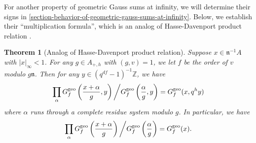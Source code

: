 \documentclass[11pt]{amsart}
\theoremstyle{plain}
\newtheorem{thm}{Theorem}[subsection]
\theoremstyle{definition}
\theoremstyle{remark}
\numberwithin{equation}{section}
\newcommand{\ZZ}{\mathbb{Z}}
\newcommand{\nfk}{\mathfrak{n}}
\newcommand{\ggsf}{G_f^{\textnormal{geo}}}
\begin{document}
	For another property of geometric Gauss sums at infinity, we will determine their signs in \ref{section-behavior-of-geometric-gauss-sums-at-infinity}.
	Below, we establish their “multiplication formula”, which is an analog of Hasse-Davenport product relation \cite{hd1935dienullstellen}.
	
	\begin{thm}[Analog of Hasse-Davenport product relation]     \label{HD-product}
		Suppose $x \in \nfk^{-1}A$ with $|x|_\infty < 1$.
		For any $g \in A_{+,h}$ with $(g,v) = 1$, we let $f$ be the order of $v$ modulo $g\nfk$.
		Then for any $y \in (q^{df}-1)^{-1}\ZZ$, we have
		$$
		\prod_{\alpha} \ggsf\left( \frac{x+\alpha}{g},y \right) \bigg/ \ggsf\left( \frac{\alpha}{g},y \right) = \ggsf(x,q^hy)
		$$
		where $\alpha$ runs through a complete residue system modulo $g$.
		In particular, we have
		$$
		\prod_{\alpha} \ggsf\left( \frac{x+\alpha}{g} \right) \bigg/ \ggsf\left( \frac{\alpha}{g} \right) = \ggsf(x).
		$$
	\end{thm}
	
\end{document}
